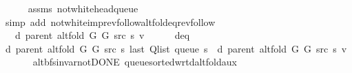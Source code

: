 \begin{isabellebody}
\ \ \ \ \isamarkupfalse%
\ assms\ not{\isacharunderscore}{\kern0pt}white{\isacharunderscore}{\kern0pt}head{\isacharunderscore}{\kern0pt}queue\isanewline
\ \ \ \ \isamarkupfalse%
\ {\isacharparenleft}{\kern0pt}simp\ add{\isacharcolon}{\kern0pt}\ not{\isacharunderscore}{\kern0pt}white{\isacharunderscore}{\kern0pt}imp{\isacharunderscore}{\kern0pt}rev{\isacharunderscore}{\kern0pt}follow{\isacharunderscore}{\kern0pt}alt{\isacharunderscore}{\kern0pt}fold{\isacharunderscore}{\kern0pt}eq{\isacharunderscore}{\kern0pt}rev{\isacharunderscore}{\kern0pt}follow{\isacharparenright}{\kern0pt}\isanewline
\ \ \isamarkupfalse%
\ \isamarkupfalse%
\ {\isachardoublequoteopen}{\isachardot}{\kern0pt}{\isachardot}{\kern0pt}{\isachardot}{\kern0pt}\ {\isacharequal}{\kern0pt}\ d\ {\isacharparenleft}{\kern0pt}parent\ {\isacharparenleft}{\kern0pt}alt{\isacharunderscore}{\kern0pt}fold\ G{}\ G{}\ src\ s{\isacharparenright}{\kern0pt}{\isacharparenright}{\kern0pt}\ v{\isachardoublequoteclose}\isanewline
\ \ \ \ \isamarkupfalse%
\ d{\isacharunderscore}{\kern0pt}eq\isanewline
\ \ \ \ \isacommand{{\isachardot}{\kern0pt}{\isachardot}{\kern0pt}}\isamarkupfalse%
\isanewline
\ \ \isamarkupfalse%
\ \isamarkupfalse%
\ {\isachardoublequoteopen}d\ {\isacharparenleft}{\kern0pt}parent\ {\isacharparenleft}{\kern0pt}alt{\isacharunderscore}{\kern0pt}fold\ G{}\ G{}\ src\ s{\isacharparenright}{\kern0pt}{\isacharparenright}{\kern0pt}\ {\isacharparenleft}{\kern0pt}last\ {\isacharparenleft}{\kern0pt}Q{\isacharunderscore}{\kern0pt}list\ {\isacharparenleft}{\kern0pt}queue\ s{\isacharparenright}{\kern0pt}{\isacharparenright}{\kern0pt}{\isacharparenright}{\kern0pt}\ {\isasymle}\ d\ {\isacharparenleft}{\kern0pt}parent\ {\isacharparenleft}{\kern0pt}alt{\isacharunderscore}{\kern0pt}fold\ G{}\ G{}\ src\ s{\isacharparenright}{\kern0pt}{\isacharparenright}{\kern0pt}\ v{\isachardoublequoteclose}\isanewline
\ \ \ \ \isacommand{{\isachardot}{\kern0pt}}\isamarkupfalse%
\isanewline
{}\isamarkupfalse%
%
\endisatagproof
{\isafoldproof}%
%
\isadelimproof
\isanewline
%
\endisadelimproof
%
\isadeliminvisible
\isanewline
%
\endisadeliminvisible
%
\isataginvisible
{}\isamarkupfalse%
\ {\isacharparenleft}{\kern0pt}\ alt{\isacharunderscore}{\kern0pt}bfs{\isacharunderscore}{\kern0pt}invar{\isacharunderscore}{\kern0pt}not{\isacharunderscore}{\kern0pt}DONE{\isacharparenright}{\kern0pt}\ queue{\isacharunderscore}{\kern0pt}sorted{\isacharunderscore}{\kern0pt}wrt{\isacharunderscore}{\kern0pt}d{\isacharunderscore}{\kern0pt}alt{\isacharunderscore}{\kern0pt}fold{\isacharunderscore}{\kern0pt}aux{\isacharcolon}{\kern0pt}\isanewline

\end{isabellebody}

